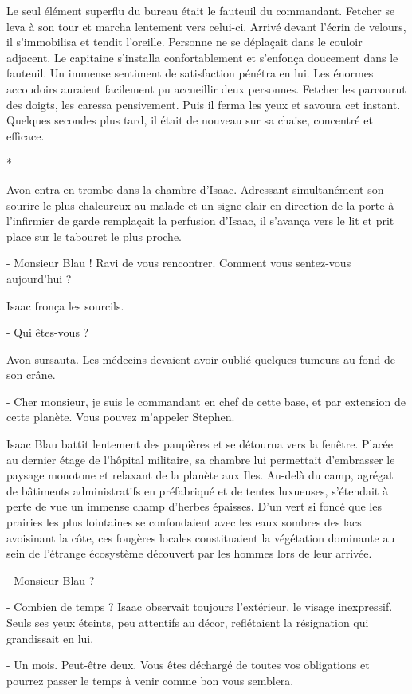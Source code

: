 \documentclass[12pt]{book}
\newcommand{\s}{\begin{center}
*
\end{center}
}
\begin{document}
Le seul élément superflu du bureau était le fauteuil du commandant. Fetcher se leva à son tour et marcha lentement vers celui-ci. Arrivé devant l'écrin de velours, il s'immobilisa et tendit l'oreille. Personne ne se déplaçait dans le couloir adjacent. Le capitaine s'installa confortablement et s'enfonça doucement dans le fauteuil. Un immense sentiment de satisfaction pénétra en lui. Les énormes accoudoirs auraient facilement pu accueillir deux personnes. Fetcher les parcourut des doigts, les caressa pensivement. Puis il ferma les yeux et savoura cet instant. Quelques secondes plus tard, il était de nouveau sur sa chaise, concentré et efficace.


\s


Avon entra en trombe dans la chambre d'Isaac. Adressant simultanément son sourire le plus chaleureux au malade et un signe clair en direction de la porte à l'infirmier de garde remplaçait la perfusion d'Isaac, il s'avança vers le lit et prit place sur le tabouret le plus proche.

- Monsieur Blau ! Ravi de vous rencontrer. Comment vous sentez-vous aujourd'hui ?

Isaac fronça les sourcils.

- Qui êtes-vous ?

Avon sursauta. Les médecins devaient avoir oublié quelques tumeurs au fond de son crâne.

- Cher monsieur, je suis le commandant en chef de cette base, et par extension de cette planète. Vous pouvez m'appeler Stephen.

Isaac Blau battit lentement des paupières et se détourna vers la fenêtre. Placée au dernier étage de l'hôpital militaire, sa chambre lui permettait d'embrasser le paysage monotone et relaxant de la planète aux Iles. Au-delà du camp, agrégat de bâtiments administratifs en préfabriqué et de tentes luxueuses, s'étendait à perte de vue un immense champ d'herbes épaisses. D'un vert si foncé que les prairies les plus lointaines se confondaient avec les eaux sombres des lacs avoisinant la côte, ces fougères locales constituaient la végétation dominante au sein de l'étrange écosystème découvert par les hommes lors de leur arrivée.

- Monsieur Blau ?

- Combien de temps ? Isaac observait toujours l'extérieur, le visage inexpressif. Seuls ses yeux éteints, peu attentifs au décor, reflétaient la résignation qui grandissait en lui.

- Un mois. Peut-être deux. Vous êtes déchargé de toutes vos obligations et pourrez passer le temps à venir comme bon vous semblera.
\end{document}
